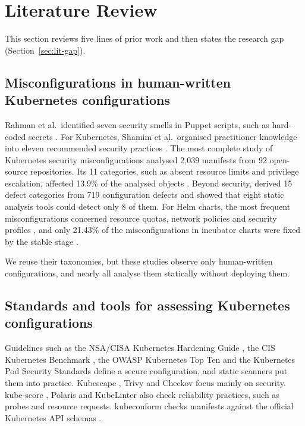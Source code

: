 \section{Literature Review}\label{sec:literature}

This section reviews five lines of prior work and then states the research gap (Section~\ref{sec:lit-gap}).

\subsection{Misconfigurations in human-written Kubernetes configurations}\label{sec:lit-human}

Rahman et al.\ identified seven security smells in Puppet scripts, such as hard-coded secrets \citep{rahman2019sevensins}. For Kubernetes, Shamim et al.\ organised practitioner knowledge into eleven recommended security practices \citep{shamim2020xicommandments}. The most complete study of Kubernetes security misconfigurations analysed 2,039 manifests from 92 open-source repositories. Its 11 categories, such as absent resource limits and privilege escalation, affected 13.9\% of the analysed objects \citep{rahman2023k8smisconfig}. Beyond security, \citet{zhang2026k8sconfigdefects} derived 15 defect categories from 719 configuration defects and showed that eight static analysis tools could detect only 8 of them. For Helm charts, the most frequent misconfigurations concerned resource quotas, network policies and security profiles \citep{minna2025helm}, and only 21.43\% of the misconfigurations in incubator charts were fixed by the stable stage \citep{ghorab2026inthewild}.

We reuse their taxonomies, but these studies observe only human-written configurations, and nearly all analyse them statically without deploying them.

\subsection{Standards and tools for assessing Kubernetes configurations}\label{sec:lit-tools}

Guidelines such as the NSA/CISA Kubernetes Hardening Guide \citep{nsacisa2022k8shardening}, the CIS Kubernetes Benchmark \citep{cis_k8s_benchmark}, the OWASP Kubernetes Top Ten \citep{owasp_k8s_top10} and the Kubernetes Pod Security Standards \citep{k8s_pod_security_standards} define a secure configuration, and static scanners put them into practice. Kubescape \citep{tool_kubescape}, Trivy \citep{tool_trivy} and Checkov \citep{tool_checkov} focus mainly on security. kube-score \citep{tool_kubescore}, Polaris \citep{tool_polaris} and KubeLinter \citep{tool_kubelinter} also check reliability practices, such as probes and resource requests. kubeconform checks manifests against the official Kubernetes API schemas \citep{tool_kubeconform}.

